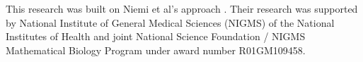 This research was built on Niemi et al's approach \citep{niemi2015empirical}. Their research was supported by National Institute of General Medical Sciences (NIGMS) of the National Institutes of Health and joint National Science Foundation / NIGMS Mathematical Biology Program under award number R01GM109458. 